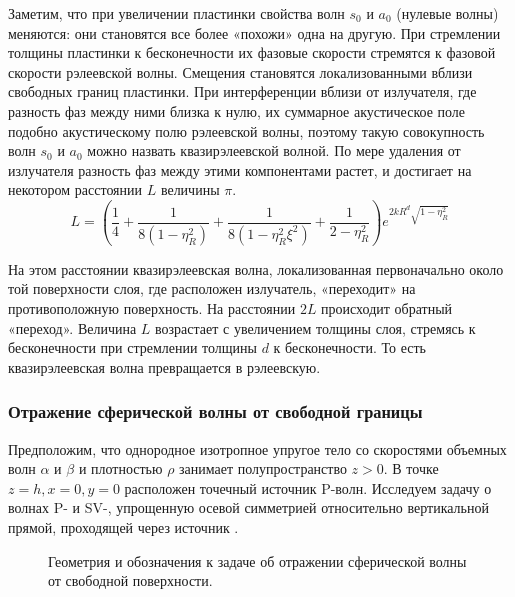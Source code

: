 Заметим, что при увеличении пластинки свойства волн $s_0$ и $a_0$ (нулевые волны) меняются: они становятся все более «похожи» одна на другую. При стремлении толщины пластинки к бесконечности их фазовые скорости стремятся к фазовой скорости рэлеевской волны. Смещения становятся локализованными вблизи свободных границ пластинки. При интерференции вблизи от излучателя, где разность фаз между ними близка к нулю, их суммарное акустическое поле подобно акустическому полю рэлеевской волны, поэтому такую совокупность волн $s_0$ и $a_0$ можно назвать квазирэлеевской волной. По мере удаления от излучателя разность фаз между этими компонентами растет, и достигает на некотором расстоянии $L$ величины $\pi$. 
\begin{equation}
L = (\frac{1}{4} + \frac{1}{8(1- \eta_{R}^{2})} + \frac{1}{8(1- \eta_{R}^{2} \xi^2)} + \frac{1}{2- \eta_{R}^{2}} ) e^{2kR^d\sqrt{1- \eta_{R}^{2}}}
\end{equation}

На этом расстоянии квазирэлеевская волна, локализованная первоначально около той поверхности слоя, где расположен излучатель, «переходит» на противоположную поверхность. На расстоянии $2L$ происходит обратный «переход». Величина $L$ возрастает с увеличением толщины слоя, стремясь к бесконечности при стремлении толщины $d$ к бесконечности. То есть квазирэлеевская волна превращается в рэлеевскую.

\clearpage
\newpage

\subsubsection{Отражение сферической волны от свободной границы}

Предположим, что однородное изотропное упругое тело со скоростями объемных волн $\alpha$ и $\beta$ и плотностью $\rho$ занимает полупространство $z > 0$.  В точке $z = h, x = 0, y = 0$ расположен точечный источник P-волн. Исследуем задачу о волнах P- и SV-, упрощенную осевой симметрией относительно вертикальной прямой, проходящей через источник \cite{lapwood}. 

\begin{figure}[h]
\caption{Геометрия и обозначения к задаче об отражении сферической волны от свободной поверхности.}
\end{figure}

